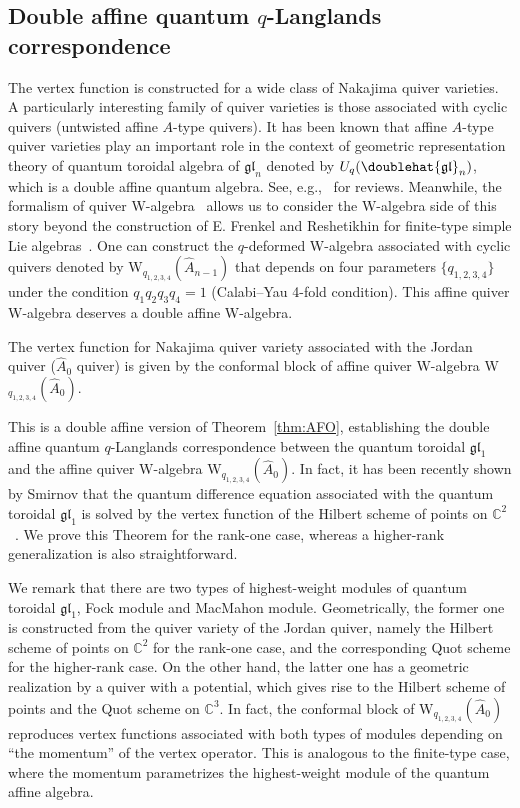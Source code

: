 \subsection{Double affine quantum $q$-Langlands correspondence}
The vertex function is constructed for a wide class of Nakajima quiver varieties.
A particularly interesting family of quiver varieties is those associated with cyclic quivers (untwisted affine $A$-type quivers).
It has been known that affine $A$-type quiver varieties play an important role in the context of geometric representation theory of quantum toroidal algebra of $\mathfrak{gl}_n$ denoted by $U_q(\doublehat{{\mathfrak{gl}}}_n)$, which is a double affine quantum algebra. 
See, e.g.,~\cite{Hernandez:2009SM,Tsymbaliuk:2022bqx,Matsuo:2023lky} for reviews.
Meanwhile, the formalism of quiver W-algebra~\cite{Kimura:2015rgi,Kimura:2016dys,Kimura:2017hez} allows us to consider the W-algebra side of this story beyond the construction of E. Frenkel and Reshetikhin for finite-type simple Lie algebras~\cite{Frenkel:1997lee}.
One can construct the $q$-deformed W-algebra associated with cyclic quivers denoted by W$_{q_{1,2,3,4}}(\widehat{A}_{n-1})$ that depends on four parameters $\{q_{1,2,3,4}\}$ under the condition $q_1 q_2 q_3 q_4 = 1$ (Calabi--Yau 4-fold condition).
This affine quiver W-algebra deserves a double affine W-algebra.
\begin{theorem}
    The vertex function for Nakajima quiver variety associated with the Jordan quiver ($\widehat{A}_0$ quiver) is given by the conformal block of affine quiver W-algebra W$_{q_{1,2,3,4}}(\widehat{A}_{0})$.
\end{theorem}
This is a double affine version of Theorem~\ref{thm:AFO}, establishing the double affine quantum $q$-Langlands correspondence between the quantum toroidal $\mathfrak{gl}_1$ and the affine quiver W-algebra W$_{q_{1,2,3,4}}(\widehat{A}_{0})$.
In fact, it has been recently shown by Smirnov that the quantum difference equation associated with the quantum toroidal $\mathfrak{gl}_1$ is solved by the vertex function of the Hilbert scheme of points on $\mathbb{C}^2$~\cite{Smirnov:2021cyf}.
We prove this Theorem for the rank-one case, whereas a higher-rank generalization is also straightforward.


We remark that there are two types of highest-weight modules of quantum toroidal $\mathfrak{gl}_1$, Fock module and MacMahon module.
Geometrically, the former one is constructed from the quiver variety of the Jordan quiver, namely the Hilbert scheme of points on $\mathbb{C}^2$ for the rank-one case, and the corresponding Quot scheme for the higher-rank case.
On the other hand, the latter one has a geometric realization by a quiver with a potential, which gives rise to the Hilbert scheme of points and the Quot scheme on $\mathbb{C}^3$.
In fact, the conformal block of W$_{q_{1,2,3,4}}(\widehat{A}_{0})$ reproduces vertex functions associated with both types of modules depending on ``the momentum'' of the vertex operator.
This is analogous to the finite-type case, where the momentum parametrizes the highest-weight module of the quantum affine algebra.

